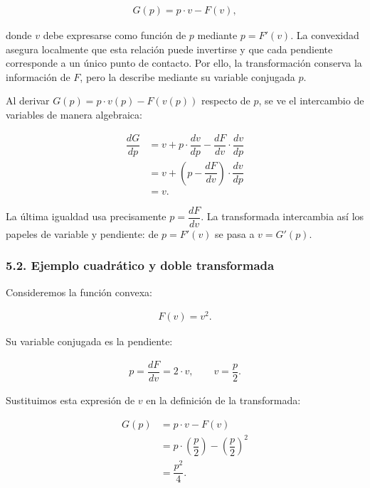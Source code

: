 \documentclass[
  spanish,
]{article}
\begin{document}
\[
\begin{aligned}
G(p) = p \cdot v - F(v),
\end{aligned}
\]

donde \(v\) debe expresarse como función de \(p\) mediante \(p=F'(v)\).
La convexidad asegura localmente que esta relación puede invertirse y
que cada pendiente corresponde a un único punto de contacto. Por ello,
la transformación conserva la información de \(F\), pero la describe
mediante su variable conjugada \(p\).

Al derivar \(G(p)=p \cdot v(p)-F(v(p))\) respecto de \(p\), se ve el
intercambio de variables de manera algebraica:

\[
\begin{aligned}
\dfrac{dG}{dp}
&= v + p \cdot \dfrac{dv}{dp} - \dfrac{dF}{dv} \cdot \dfrac{dv}{dp} \\
&= v + \left(p-\dfrac{dF}{dv}\right) \cdot \dfrac{dv}{dp} \\
&= v.
\end{aligned}
\]

La última igualdad usa precisamente \(p=\dfrac{dF}{dv}\). La
transformada intercambia así los papeles de variable y pendiente: de
\(p=F'(v)\) se pasa a \(v=G'(p)\).

\subsubsection{5.2. Ejemplo cuadrático y doble
transformada}\label{ejemplo-cuadruxe1tico-y-doble-transformada}

Consideremos la función convexa:

\[
\begin{aligned}
F(v)=v^2.
\end{aligned}
\]

Su variable conjugada es la pendiente:

\[
\begin{aligned}
p = \dfrac{dF}{dv} = 2 \cdot v,
\qquad
v = \dfrac{p}{2}.
\end{aligned}
\]

Sustituimos esta expresión de \(v\) en la definición de la transformada:

\[
\begin{aligned}
G(p)
&= p \cdot v - F(v) \\
&= p \cdot \left(\dfrac{p}{2}\right) - \left(\dfrac{p}{2}\right)^2 \\
&= \dfrac{p^2}{4}.
\end{aligned}
\]
\end{document}
